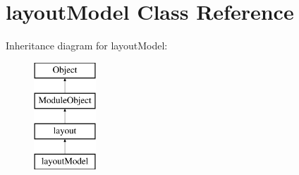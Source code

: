 \hypertarget{classlayoutModel}{}\section{layout\+Model Class Reference}
\label{classlayoutModel}
Inheritance diagram for layout\+Model\+:\begin{figure}[H]
\begin{center}
\leavevmode
\includegraphics[height=4.000000cm]{classlayoutModel}
\end{center}
\end{figure}
